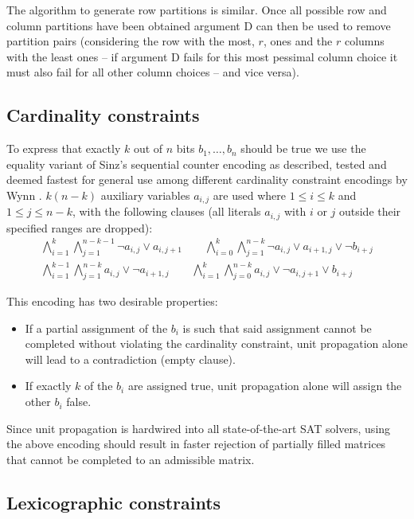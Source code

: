 \documentclass[10pt,a4paper]{article}
\theoremstyle{definition}
\begin{document}
	The algorithm to generate row partitions is similar. Once all possible row and column partitions have been obtained argument D can then be used to remove partition pairs (considering the row with the most, $r$, ones and the $r$ columns with the least ones -- if argument D fails for this most pessimal column choice it must also fail for all other column choices -- and vice versa).
	
	\subsection{Cardinality constraints}
	
	To express that exactly $k$ out of $n$ bits $b_1,\dots,b_n$ should be true we use the equality variant of Sinz's sequential counter encoding \cite{sinz} as described, tested and deemed fastest for general use among different cardinality constraint encodings by Wynn \cite{cardconstraint}. $k(n-k)$ auxiliary variables $a_{i,j}$ are used where $1\le i\le k$ and $1\le j\le n-k$, with the following clauses (all literals $a_{i,j}$ with $i$ or $j$ outside their specified ranges are dropped):
	\begin{gather*}
		\bigwedge_{i=1}^k\bigwedge_{j=1}^{n-k-1}\neg a_{i,j}\lor a_{i,j+1}\qquad\bigwedge_{i=0}^k\bigwedge_{j=1}^{n-k}\neg a_{i,j}\lor a_{i+1,j}\lor\neg b_{i+j}\\
		\bigwedge_{i=1}^{k-1}\bigwedge_{j=1}^{n-k}a_{i,j}\lor\neg a_{i+1,j}\qquad\bigwedge_{i=1}^k\bigwedge_{j=0}^{n-k}a_{i,j}\lor\neg a_{i,j+1}\lor b_{i+j}
	\end{gather*}
	
	This encoding has two desirable properties:
	\begin{itemize}
		\item If a partial assignment of the $b_i$ is such that said assignment cannot be completed without violating the cardinality constraint, unit propagation alone will lead to a contradiction (empty clause).
		\item If exactly $k$ of the $b_i$ are assigned true, unit propagation alone will assign the other $b_i$ false.
	\end{itemize}
	
	Since unit propagation is hardwired into all state-of-the-art SAT solvers, using the above encoding should result in faster rejection of partially filled matrices that cannot be completed to an admissible matrix.
	
	\subsection{Lexicographic constraints}
	
\end{document}
